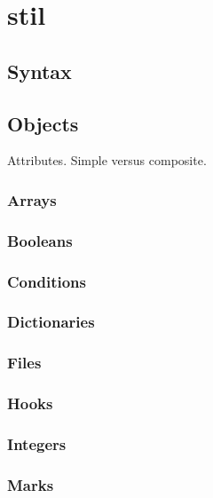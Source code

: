 %
%
%
%
%              

\clearemptydoublepage
\chapter{stil}
\label{stillang}

\section{Syntax}

\section{Objects}

Attributes.
Simple versus composite.

\subsection{Arrays}
\subsection{Booleans}
\subsection{Conditions}
\subsection{Dictionaries}
\subsection{Files}
\subsection{Hooks}
\subsection{Integers}
\subsection{Marks}

